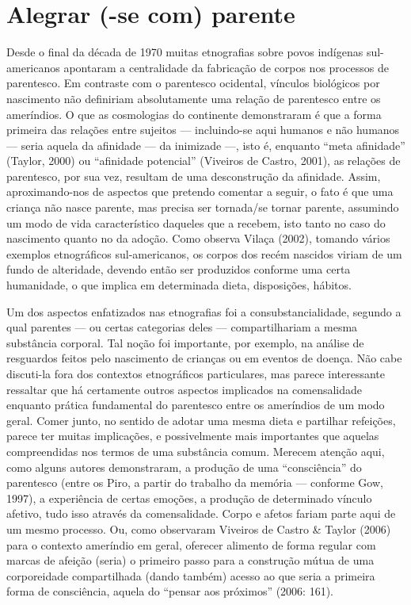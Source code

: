 \section{Alegrar (-se com) parente}

Desde o final da década de 1970 muitas etnografias sobre povos indígenas
sul-americanos apontaram a centralidade da fabricação de corpos nos
processos de parentesco. Em contraste com o parentesco ocidental,
vínculos biológicos por nascimento não definiriam absolutamente uma
relação de parentesco entre os ameríndios. O que as cosmologias do
continente demonstraram é que a forma primeira das relações entre
sujeitos --- incluindo-se aqui humanos e não humanos --- seria aquela da
afinidade --- da inimizade ---, isto é, enquanto ``meta afinidade'' (Taylor,
2000) ou ``afinidade potencial'' (Viveiros de Castro, 2001), as relações
de parentesco, por sua vez, resultam de uma desconstrução da afinidade.
Assim, aproximando-nos de aspectos que pretendo comentar a seguir, o
fato é que uma criança não nasce parente, mas precisa ser tornada/se
tornar parente, assumindo um modo de vida característico daqueles que a
recebem, isto tanto no caso do nascimento quanto no da adoção. Como
observa Vilaça (2002), tomando vários exemplos etnográficos
sul-americanos, os corpos dos recém nascidos viriam de um fundo de
alteridade, devendo então ser produzidos conforme uma certa humanidade,
o que implica em determinada dieta, disposições, hábitos.

Um dos aspectos enfatizados nas etnografias foi a consubstancialidade,
segundo a qual parentes --- ou certas categorias deles --- compartilhariam
a mesma substância corporal. Tal noção foi importante, por exemplo, na
análise de resguardos feitos pelo nascimento de crianças ou em eventos
de doença. Não cabe discuti-la fora dos contextos etnográficos
particulares, mas parece interessante ressaltar que há certamente
outros aspectos implicados na comensalidade enquanto prática
fundamental do parentesco entre os ameríndios de um modo geral. Comer
junto, no sentido de adotar uma mesma dieta e partilhar refeições,
parece ter muitas implicações, e possivelmente mais importantes que
aquelas compreendidas nos termos de uma substância comum. Merecem
atenção aqui, como alguns autores demonstraram, a produção de uma
``consciência'' do parentesco (entre os Piro, a partir do trabalho da
memória --- conforme Gow, 1997), a experiência de certas emoções, a
produção de determinado vínculo afetivo, tudo isso através da
comensalidade. Corpo e afetos fariam parte aqui de um mesmo processo.
Ou, como observaram Viveiros de Castro \& Taylor (2006) para o contexto
ameríndio em geral, oferecer alimento de forma regular com marcas de
afeição (seria) o primeiro passo para a construção mútua de uma
corporeidade compartilhada (dando também) acesso ao que seria a
primeira forma de consciência, aquela do ``pensar aos próximos'' (2006:
161).


